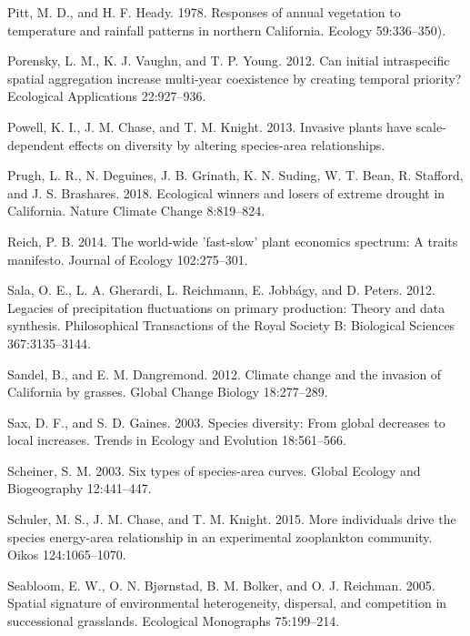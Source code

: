 \documentclass[twoside,12pt,final]{ucthesis-CA2012}
\newlength{\cslhangindent}
\newenvironment{cslreferences}%
  {\setlength{\parindent}{0pt}%
  \everypar{\setlength{\hangindent}{\cslhangindent}}\ignorespaces}%
  {\par}
\begin{document}
\begin{ucmainmatter}
\begin{cslreferences}
\leavevmode\hypertarget{ref-Pitt1978}{}%
Pitt, M. D., and H. F. Heady. 1978. Responses of annual vegetation to temperature and rainfall patterns in northern California. Ecology 59:336--350).

\leavevmode\hypertarget{ref-Porensky2012}{}%
Porensky, L. M., K. J. Vaughn, and T. P. Young. 2012. Can initial intraspecific spatial aggregation increase multi-year coexistence by creating temporal priority? Ecological Applications 22:927--936.

\leavevmode\hypertarget{ref-powell2013}{}%
Powell, K. I., J. M. Chase, and T. M. Knight. 2013. Invasive plants have scale-dependent effects on diversity by altering species-area relationships.

\leavevmode\hypertarget{ref-Prugh2018}{}%
Prugh, L. R., N. Deguines, J. B. Grinath, K. N. Suding, W. T. Bean, R. Stafford, and J. S. Brashares. 2018. Ecological winners and losers of extreme drought in California. Nature Climate Change 8:819--824.

\leavevmode\hypertarget{ref-Reich2014}{}%
Reich, P. B. 2014. The world-wide 'fast-slow' plant economics spectrum: A traits manifesto. Journal of Ecology 102:275--301.

\leavevmode\hypertarget{ref-Sala2012b}{}%
Sala, O. E., L. A. Gherardi, L. Reichmann, E. Jobbágy, and D. Peters. 2012. Legacies of precipitation fluctuations on primary production: Theory and data synthesis. Philosophical Transactions of the Royal Society B: Biological Sciences 367:3135--3144.

\leavevmode\hypertarget{ref-Sandel2012}{}%
Sandel, B., and E. M. Dangremond. 2012. Climate change and the invasion of California by grasses. Global Change Biology 18:277--289.

\leavevmode\hypertarget{ref-sax2003}{}%
Sax, D. F., and S. D. Gaines. 2003. Species diversity: From global decreases to local increases. Trends in Ecology and Evolution 18:561--566.

\leavevmode\hypertarget{ref-scheiner2003}{}%
Scheiner, S. M. 2003. Six types of species-area curves. Global Ecology and Biogeography 12:441--447.

\leavevmode\hypertarget{ref-schuler2015}{}%
Schuler, M. S., J. M. Chase, and T. M. Knight. 2015. More individuals drive the species energy-area relationship in an experimental zooplankton community. Oikos 124:1065--1070.

\leavevmode\hypertarget{ref-seabloom2005}{}%
Seabloom, E. W., O. N. Bjørnstad, B. M. Bolker, and O. J. Reichman. 2005. Spatial signature of environmental heterogeneity, dispersal, and competition in successional grasslands. Ecological Monographs 75:199--214.


\end{cslreferences}
\end{ucmainmatter}
\end{document}
